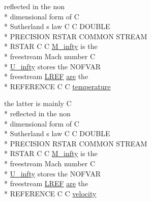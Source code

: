 \begin{DoxyCompactItemize}
reflected in the non \\*
dimensional form of C \\*
Sutherland s law C C D\-O\-U\-B\-L\-E \\*
P\-R\-E\-C\-I\-S\-I\-O\-N R\-S\-T\-A\-R C\-O\-M\-M\-O\-N S\-T\-R\-E\-A\-M \\*
R\-S\-T\-A\-R C C \hyperlink{msa20_2home_2abonfi_2_c_f_d__codes_2_eul_f_s_83_82_83_2include_2stream_8com_a57c765efd76d44669f6966962bda2d72}{M\-\_\-infty} is the \\*
freestream Mach number C \\*
\hyperlink{msa20_2home_2abonfi_2_c_f_d__codes_2_eul_f_s_83_82_83_2include_2stream_8com_a3306f725a42d6173548f0867aa4313ef}{U\-\_\-infty} stores the N\-O\-F\-V\-A\-R \\*
freestream \hyperlink{msa20_2home_2abonfi_2_c_f_d__codes_2_eul_f_s_83_82_83_2include_2stream_8com_a19d492a15feda819ed49e580c6a1568f}{L\-R\-E\-F} \hyperlink{msa20_2home_2abonfi_2_c_f_d__codes_2_eul_f_s_83_82_83_2include_2ibc8_8com_a7f7721a0bb3c1d35cfbfbcfd6efc1548}{are} the \\*
R\-E\-F\-E\-R\-E\-N\-C\-E C C \hyperlink{msa20_2home_2abonfi_2_c_f_d__codes_2_eul_f_s_83_82_83_2include_2stream_8com_a46fb926ed83966d981ba4bbfd791eaed}{temperature}
\item 
the latter is mainly C \\*
reflected in the non \\*
dimensional form of C \\*
Sutherland s law C C D\-O\-U\-B\-L\-E \\*
P\-R\-E\-C\-I\-S\-I\-O\-N R\-S\-T\-A\-R C\-O\-M\-M\-O\-N S\-T\-R\-E\-A\-M \\*
R\-S\-T\-A\-R C C \hyperlink{msa20_2home_2abonfi_2_c_f_d__codes_2_eul_f_s_83_82_83_2include_2stream_8com_a57c765efd76d44669f6966962bda2d72}{M\-\_\-infty} is the \\*
freestream Mach number C \\*
\hyperlink{msa20_2home_2abonfi_2_c_f_d__codes_2_eul_f_s_83_82_83_2include_2stream_8com_a3306f725a42d6173548f0867aa4313ef}{U\-\_\-infty} stores the N\-O\-F\-V\-A\-R \\*
freestream \hyperlink{msa20_2home_2abonfi_2_c_f_d__codes_2_eul_f_s_83_82_83_2include_2stream_8com_a19d492a15feda819ed49e580c6a1568f}{L\-R\-E\-F} \hyperlink{msa20_2home_2abonfi_2_c_f_d__codes_2_eul_f_s_83_82_83_2include_2ibc8_8com_a7f7721a0bb3c1d35cfbfbcfd6efc1548}{are} the \\*
R\-E\-F\-E\-R\-E\-N\-C\-E C C \hyperlink{msa20_2home_2abonfi_2_c_f_d__codes_2_eul_f_s_83_82_83_2include_2stream_8com_a4acbada976d4b32776408b1d1e55321a}{velocity}

\end{DoxyCompactItemize}
